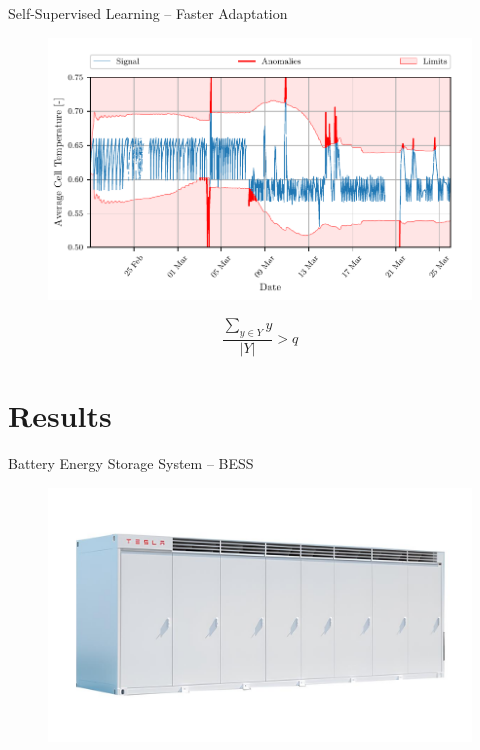 \documentclass[aspectratio=169]{beamer}
\begin{document}
\begin{frame}{Self-Supervised Learning -- Faster Adaptation}
    \begin{figure}
        \begin{center}
            \includegraphics[width=0.62\linewidth]{../ilustrate/pc2023/bess/final_uniform_xticks_thresh.pdf}
        \end{center}
    \end{figure}
    \begin{equation}
        {\frac{\sum_{y\in Y}y}{|Y|}} > q\text{} \nonumber\label{eq:update}
    \end{equation}
\end{frame}

\section{Results}

\begin{frame}{Battery Energy Storage System -- BESS}
    \begin{figure}[h]
        \begin{center}
            \includegraphics[width=0.62\linewidth]{figures/megapack.jpeg}
        \end{center}
    \end{figure}
\end{frame}
\end{document}
